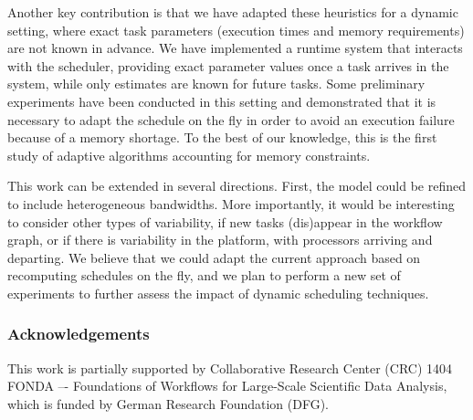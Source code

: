 \documentclass[conference]{IEEEtran}
\newcommand{\algo}[1]{\textsc{#1}}
\newcommand{\heftmm}{\algo{HEFTM-MM}\xspace}
\newcommand{\heftbl}{\algo{HEFTM-BL}\xspace}
\newcommand{\heftblc}{\algo{HEFTM-BLC}\xspace}
\begin{document}
%

Another key contribution is that we have adapted these heuristics for a dynamic setting, where exact
task parameters (execution times and memory requirements) are not known in advance. 
We have implemented a runtime system that interacts with the scheduler, providing exact
parameter values once a task arrives in the system, while only estimates are known for future tasks. 
Some preliminary experiments have been conducted in this setting and demonstrated that
it is necessary to adapt the schedule on the fly in order to avoid an execution failure because
of a memory shortage. To the best of our knowledge, this is the first study of adaptive
algorithms accounting for memory constraints. 

This work can be extended in several directions. First, the model could be refined to include
heterogeneous bandwidths. %
More importantly, it would be interesting to consider other types of variability, \egc
if new tasks (dis)appear in the workflow graph, or if there is variability in the platform, 
with processors arriving and departing. We believe that we could adapt the current approach
based on recomputing schedules on the fly, and we plan to perform a new set of experiments
to further assess the impact of dynamic scheduling techniques. 

\medskip

\subsubsection*{Acknowledgements}
This work is partially supported by Collaborative Research Center (CRC) 1404 FONDA
–- Foundations of Workflows for Large-Scale Scientific Data Analysis, which is funded
by German Research Foundation (DFG).


\balance
    
\end{document}
